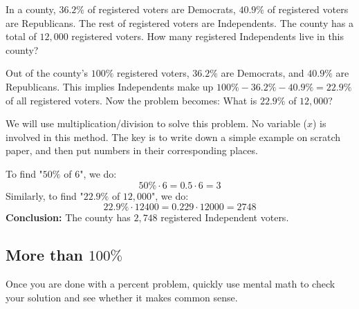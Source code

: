 \begin{myexample}
In a county, $36.2\%$ of registered voters are Democrats, $40.9\%$ of registered voters are Republicans. The rest of registered voters are Independents. The county has a total of $12,000$ registered voters. How many registered Independents live in this county?
\end{myexample}
\begin{solution}
Out of the county's $100\%$ registered voters, $36.2\%$ are Democrats, and $40.9\%$ are Republicans. This implies Independents make up $100\%-36.2\%-40.9\%=22.9\%$ of all registered voters. Now the problem becomes: What is $22.9\%$ of $12,000$?

We will use multiplication/division to solve this problem. No variable ($x$) is involved in this method. The key is to write down a simple example on scratch paper, and then put numbers in their corresponding places.

To find "$50\%$ of $6$", we do:
\[ 50\% \cdot 6=0.5\cdot6=3 \]
Similarly, to find "$22.9\%$ of $12,000$", we do:
\[ 22.9\% \cdot 12400=0.229\cdot12000= 2748\]
\textbf{Conclusion:} The county has $2,748$ registered Independent voters.

\end{solution}

\subsection{More than $100\%$}
Once you are done with a percent problem, quickly use mental math to check your solution and see whether it makes common sense.

